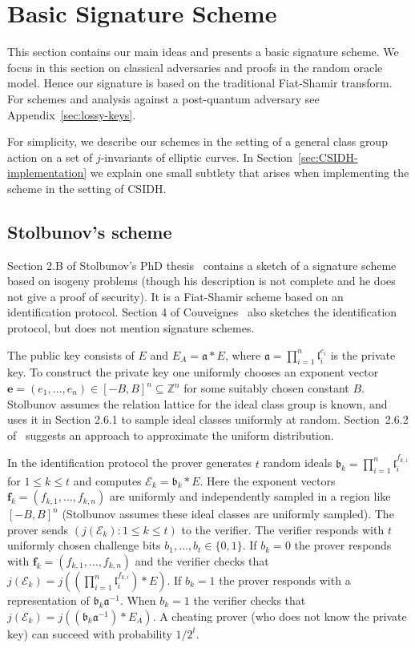 \documentclass{llncs}
\newcommand{\E}{\mathcal{E}}
\newcommand{\Z}{\mathbb{Z}}
\renewcommand{\a}{\mathfrak{a}}
\renewcommand{\b}{\mathfrak{b}}
\renewcommand{\l}{\mathfrak{l}}
\newcommand{\e}{\mathbf{e}}
\newcommand{\f}{\mathbf{f}}
\begin{document}
\section{Basic Signature Scheme}\label{sec:basic-scheme}

This section contains our main ideas and presents a basic signature scheme.
We focus in this section on classical adversaries and proofs in the random oracle model.
Hence our signature is based on the traditional Fiat-Shamir transform.
For schemes and analysis against a post-quantum adversary see Appendix~\ref{sec:lossy-keys}.

For simplicity, we describe our schemes in the setting of a general class group action on a set of $j$-invariants of elliptic curves.
In Section~\ref{sec:CSIDH-implementation} we explain one small subtlety that arises when implementing the scheme in the setting of CSIDH.


\subsection{Stolbunov's scheme}\label{sec:Stolbunov}

Section 2.B of Stolbunov's PhD thesis~\cite{Sto12} contains a sketch of a signature scheme based on isogeny problems (though his description is not complete and he does not give a proof of security).
It is a Fiat-Shamir scheme based on an identification protocol.
Section 4 of Couveignes~\cite{Couv06} also sketches the identification protocol, but does not mention signature schemes.


The public key consists of $E$ and $E_A = \a * E$, where $\a = \prod_{i=1}^n \l_i^{e_i}$ is the private key.
To construct the private key one uniformly chooses an exponent vector $\e = (e_1, \dots, e_n) \in [-B,B]^n \subseteq \Z^n$ for some suitably chosen constant $B$.
Stolbunov assumes the relation lattice for the ideal class group is known, and uses it in Section 2.6.1 to sample ideal classes uniformly at random.
Section~2.6.2 of~\cite{Sto12} suggests an approach to approximate the uniform distribution.

In the identification protocol the prover generates $t$ random ideals $\b_k = \prod_{i=1}^n \l_i^{f_{k,i}}$ for $1 \le k \le t$ and computes $\E_k = \b_k * E$.
Here the exponent vectors $\f_k = ( f_{k,1}, \dots, f_{k,n} )$ are uniformly and independently sampled in a region like $[-B,B]^n$ (Stolbunov assumes these ideal classes are uniformly sampled).
The prover sends $(j( \E_k ) : 1 \le k \le t )$ to the verifier.
The verifier responds with $t$ uniformly chosen challenge bits $b_1, \dots, b_t \in \{0,1\}$.
If $b_k = 0$ the prover responds with $\f_k = ( f_{k,1}, \dots, f_{k,n} )$ and the verifier checks that $j(\E_k) = j( (\prod_{i=1}^n \l_i^{f_{k,i}}) * E )$.
If $b_k = 1$ the prover responds with a representation of $\b_k \a^{-1}$.
When $b_k=1$ the verifier checks that $j(\E_k) = j( (\b_k \a^{-1}) * E_A )$.
A cheating prover (who does not know the private key) can succeed with probability $1/2^t$.
\end{document}
